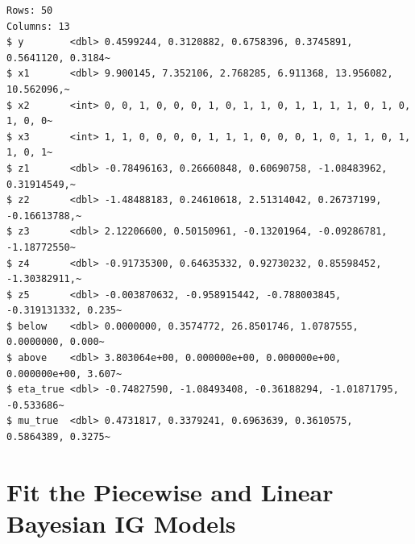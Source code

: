 \documentclass[
  english,
  letterpaper,
  DIV=11,
  numbers=noendperiod]{scrartcl}
\begin{document}
\begin{verbatim}
Rows: 50
Columns: 13
$ y        <dbl> 0.4599244, 0.3120882, 0.6758396, 0.3745891, 0.5641120, 0.3184~
$ x1       <dbl> 9.900145, 7.352106, 2.768285, 6.911368, 13.956082, 10.562096,~
$ x2       <int> 0, 0, 1, 0, 0, 0, 1, 0, 1, 1, 0, 1, 1, 1, 1, 0, 1, 0, 1, 0, 0~
$ x3       <int> 1, 1, 0, 0, 0, 0, 1, 1, 1, 0, 0, 0, 1, 0, 1, 1, 0, 1, 1, 0, 1~
$ z1       <dbl> -0.78496163, 0.26660848, 0.60690758, -1.08483962, 0.31914549,~
$ z2       <dbl> -1.48488183, 0.24610618, 2.51314042, 0.26737199, -0.16613788,~
$ z3       <dbl> 2.12206600, 0.50150961, -0.13201964, -0.09286781, -1.18772550~
$ z4       <dbl> -0.91735300, 0.64635332, 0.92730232, 0.85598452, -1.30382911,~
$ z5       <dbl> -0.003870632, -0.958915442, -0.788003845, -0.319131332, 0.235~
$ below    <dbl> 0.0000000, 0.3574772, 26.8501746, 1.0787555, 0.0000000, 0.000~
$ above    <dbl> 3.803064e+00, 0.000000e+00, 0.000000e+00, 0.000000e+00, 3.607~
$ eta_true <dbl> -0.74827590, -1.08493408, -0.36188294, -1.01871795, -0.533686~
$ mu_true  <dbl> 0.4731817, 0.3379241, 0.6963639, 0.3610575, 0.5864389, 0.3275~
\end{verbatim}

\section{Fit the Piecewise and Linear Bayesian IG
Models}\label{fit-the-piecewise-and-linear-bayesian-ig-models}
\end{document}
